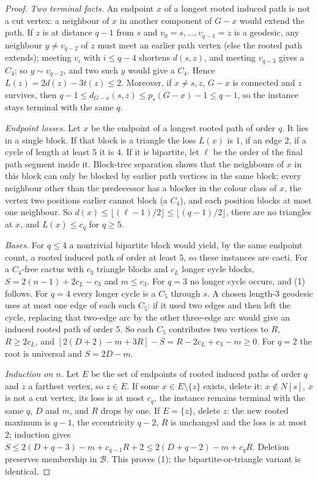 \documentclass[11pt]{amsart}
\theoremstyle{definition}
\theoremstyle{remark}
\newcommand{\pp}{p}
\begin{document}
\begin{proof}
\emph{Two terminal facts.} An endpoint $x$ of a longest rooted induced path is not a cut vertex: a neighbour of $x$ in another component of $G-x$ would extend the path. If $z$ is at distance $q-1$ from $s$ and $v_0=s,\dots,v_{q-1}=z$ is a geodesic, any neighbour $y\ne v_{q-2}$ of $z$ must meet an earlier path vertex (else the rooted path extends); meeting $v_i$ with $i\le q-4$ shortens $d(s,z)$, and meeting $v_{q-3}$ gives a $C_4$; so $y\sim v_{q-2}$, and two such $y$ would give a $C_4$. Hence $L(z)=2d(z)-3t(z)\le2$. Moreover, if $x\ne s,z$, $G-x$ is connected and $z$ survives, then $q-1\le d_{G-x}(s,z)\le\pp_s(G-x)-1\le q-1$, so the instance stays terminal with the same $q$.

\emph{Endpoint losses.} Let $x$ be the endpoint of a longest rooted path of order $q$. It lies in a single block. If that block is a triangle the loss $L(x)$ is $1$, if an edge $2$, if a cycle of length at least $5$ it is $4$. If it is bipartite, let $\ell$ be the order of the final path segment inside it. Block-tree separation shows that the neighbours of $x$ in this block can only be blocked by earlier path vertices in the same block; every neighbour other than the predecessor has a blocker in the colour class of $x$, the vertex two positions earlier cannot block (a $C_4$), and each position blocks at most one neighbour. So $d(x)\le\lfloor(\ell-1)/2\rfloor\le\lfloor(q-1)/2\rfloor$, there are no triangles at $x$, and $L(x)\le c_q$ for $q\ge5$.

\emph{Bases.} For $q\le4$ a nontrivial bipartite block would yield, by the same endpoint count, a rooted induced path of order at least $5$, so these instances are cacti. For a $C_4$-free cactus with $c_3$ triangle blocks and $c_L$ longer cycle blocks, $S=2(n-1)+2c_L-c_3$ and $m\le c_3$. For $q=3$ no longer cycle occurs, and (1) follows. For $q=4$ every longer cycle is a $C_5$ through $s$. A chosen length-$3$ geodesic uses at most one edge of each such $C_5$: if it used two edges and then left the cycle, replacing that two-edge arc by the other three-edge arc would give an induced rooted path of order $5$. So each $C_5$ contributes two vertices to $R$, $R\ge2c_L$, and $[2(D+2)-m+3R]-S=R-2c_L+c_3-m\ge0$. For $q=2$ the root is universal and $S=2D-m$.

\emph{Induction on $n$.} Let $E$ be the set of endpoints of rooted induced paths of order $q$ and $z$ a farthest vertex, so $z\in E$. If some $x\in E\setminus\{z\}$ exists, delete it: $x\notin N[s]$, $x$ is not a cut vertex, its loss is at most $c_q$, the instance remains terminal with the same $q$, $D$ and $m$, and $R$ drops by one. If $E=\{z\}$, delete $z$: the new rooted maximum is $q-1$, the eccentricity $q-2$, $R$ is unchanged and the loss is at most $2$; induction gives $S\le2(D+q-3)-m+c_{q-1}R+2\le2(D+q-2)-m+c_qR$. Deletion preserves membership in $\mathcal B$. This proves (1); the bipartite-or-triangle variant is identical.


\end{proof}
\end{document}

